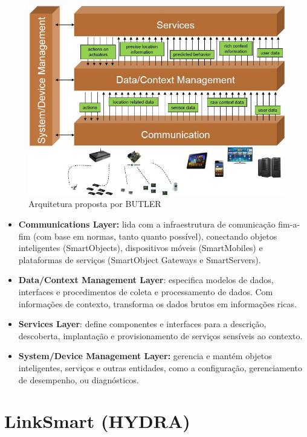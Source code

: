 \begin{figure}
\begin{centering}
\includegraphics[width=1\linewidth]{Imagens/Cap_3/butler}
\par\end{centering}
\caption{Arquitetura proposta por BUTLER \cite{BUTLER}\label{fig:BUTLER}}
\end{figure}

\begin{itemize}
\item \textbf{Communications Layer:} lida com a infraestrutura de comunicação
fim-a-fim (com base em normas, tanto quanto possível), conectando
objetos inteligentes (SmartObjects), dispositivos móveis (SmartMobiles)
e plataformas de serviços (SmartObject Gateways e SmartServers). 
\item \textbf{Data/Context Management Layer}: especifica modelos de dados,
interfaces e procedimentos de coleta e processamento de dados. Com
informações de contexto, transforma os dados brutos em informações
ricas. 
\item \textbf{Services Layer}: define componentes e interfaces para a descrição,
descoberta, implantação e provisionamento de serviços sensíveis ao
contexto. 
\item \textbf{System/Device Management Layer:} gerencia e mantém objetos
inteligentes, serviços e outras entidades, como a configuração, gerenciamento
de desempenho, ou diagnósticos.
\end{itemize}

\section{LinkSmart (HYDRA)}

